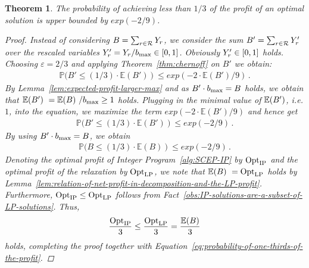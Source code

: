 \documentclass[10pt, conference, letterpaper]{IEEEtran}
\newtheorem{theorem}{Theorem}
\begin{document}
\begin{theorem}
\label{thm:probability-of-not-succeeding-in-objective}
The probability of achieving less than $1/3$ of the profit of an optimal solution is upper bounded by $exp(-2/9)$.
\begin{proof}

Instead of considering $B = \sum_{\req \in \requests} \randVarY$, we consider the sum $B' = \sum_{\req \in \requests} \randVarY'$ over the rescaled variables $\randVarY' = \randVarY / \VprofitMax \in [0,1]$. Obviously $\randVarY' \in [0,1]$ holds.
Choosing $\varepsilon = 2/3$ and applying Theorem~\ref{thm:chernoff} on $B'$ we obtain:
\begin{align}
\mathbb{P} \big( B' \leq (1/3)\cdot \mathbb{E}(B')~\big)~\leq exp(-2\cdot \mathbb{E}(B')/9)\,.
\end{align}
By Lemma~\ref{lem:expected-profit-larger-max} and as $B' \cdot b_{\max} = B$ holds, we obtain that $\mathbb{E}(B')~= \mathbb{E}(B)~/ b_{\max} \geq 1$ holds. Plugging in the \emph{minimal} value of $\mathbb{E}(B')$, i.e. $1$, into the equation, we maximize the term $exp(-2\cdot \mathbb{E}(B')/9)$ and hence get \begin{align}
\mathbb{P} \big( B' \leq (1/3)\cdot \mathbb{E}(B')~\big)~\leq exp(-2/9)\,.
\end{align}
By using $B' \cdot b_{\max} = B$, we obtain
\begin{align}
\mathbb{P} \big( B \leq (1/3)\cdot \mathbb{E}(B)~\big)~\leq exp(-2/9)\,.
\label{eq:probability-of-one-thirds-of-the-profit}
\end{align}
Denoting the optimal profit of Integer Program~\ref{alg:SCEP-IP} by $\textnormal{Opt}_{\textnormal{IP}}$ and the optimal profit of the relaxation by $\textnormal{Opt}_{\textnormal{LP}}$, we note that $\mathbb{E}(B)~= \textnormal{Opt}_{\textnormal{LP}}$ holds by Lemma~\ref{lem:relation-of-net-profit-in-decomposition-and-the-LP-profit}. Furthermore, $\textnormal{Opt}_{\textnormal{IP}} \leq \textnormal{Opt}_{\textnormal{LP}}$ follows from Fact~\ref{obs:IP-solutions-are-a-subset-of-LP-solutions}. Thus, 
\begin{align}
\frac{\textnormal{Opt}_{\textnormal{IP}}}{3} \leq 
\frac{\textnormal{Opt}_{\textnormal{LP}}}{3} = 
\frac{\mathbb{E}(B)}{3 }
\end{align}
holds, completing the proof together with Equation~\ref{eq:probability-of-one-thirds-of-the-profit}.
\end{proof}
\end{theorem}
\end{document}
